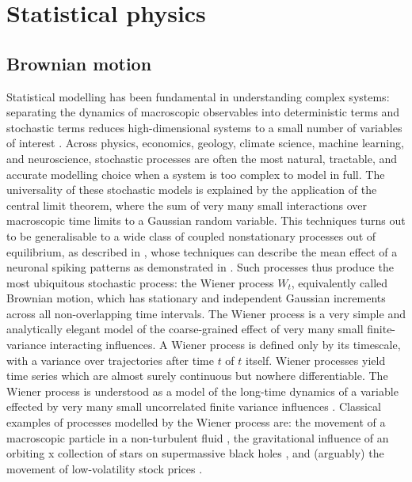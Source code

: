 \section{Statistical physics}\label{sec:stat_phys}
\subsection{Brownian motion}\label{brown_mot}
Statistical modelling has been fundamental in understanding complex systems: separating the dynamics of macroscopic observables into deterministic terms and stochastic terms reduces high-dimensional systems to a small number of variables of interest \cite{hassler_stochastic_2016, cunchala2024basicoverviewvariousstochastic}. Across physics, economics, geology, climate science, machine learning, and neuroscience, stochastic processes are often the most natural, tractable, and accurate modelling choice when a system is too complex to model in full. The universality of these stochastic models is explained by the application of the central limit theorem, where the sum of very many small interactions over macroscopic time limits to a Gaussian random variable. This techniques turns out to be generalisable to a wide class of coupled nonstationary processes out of equilibrium, as described in \textcite{Izvekov_2025_Mori}, whose techniques can describe the mean effect of a neuronal spiking patterns as demonstrated in \textcite{La_Camera_2022_meanfieldneuron}. Such processes thus produce the most ubiquitous stochastic process: the Wiener process $W_t$, equivalently called Brownian motion, which has stationary and independent Gaussian increments across all non-overlapping time intervals. The Wiener process is a very simple and analytically elegant model of the coarse-grained effect of very many small finite-variance interacting influences. A Wiener process is defined only by its timescale, with a variance over trajectories after time $t$ of $t$ itself. Wiener processes yield time series which are almost surely continuous but nowhere differentiable. The Wiener process is understood as a model of the long-time dynamics of a variable effected by very many small uncorrelated finite variance influences \cite{hassler_stochastic_2016}. Classical examples of processes modelled by the Wiener process are: the movement of a macroscopic particle in a non-turbulent fluid \cite{hassler_stochastic_2016}, the gravitational influence of an orbiting x collection of stars on supermassive black holes \cite{Chandrasekhar1943, Merritt2007a}, and (arguably) the movement of low-volatility stock prices \cite{cunchala2024basicoverviewvariousstochastic}.

